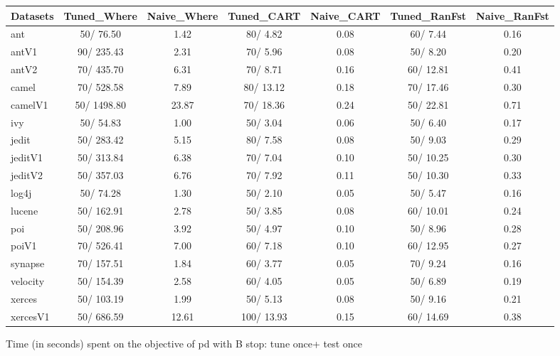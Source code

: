 \documentclass{acm_proc_article-sp}
\begin{document}


\clearpage
\begin{figure*}[!ht]
\scriptsize
\centering
  \begin{tabular}{l|c |c |c |c |c |c }
    \hline\hline
    Datasets & Tuned\_Where & Naive\_Where & Tuned\_CART & Naive\_CART & Tuned\_RanFst & Naive\_RanFst\\
    \hline
    ant & 50/ 76.50 & 1.42 & 80/ 4.82 & 0.08 & 60/ 7.44 & 0.16\\
    antV1 & 90/ 235.43 & 2.31 & 70/ 5.96 & 0.08 & 50/ 8.20 & 0.20\\
    antV2 & 70/ 435.70 & 6.31 & 70/ 8.71 & 0.16 & 60/ 12.81 & 0.41\\
    camel & 70/ 528.58 & 7.89 & 80/ 13.12 & 0.18 & 70/ 17.46 & 0.30\\
    camelV1 & 50/ 1498.80 & 23.87 & 70/ 18.36 & 0.24 & 50/ 22.81 & 0.71\\
    ivy & 50/ 54.83 & 1.00 & 50/ 3.04 & 0.06 & 50/ 6.40 & 0.17\\
    jedit & 50/ 283.42 & 5.15 & 80/ 7.58 & 0.08 & 50/ 9.03 & 0.29\\
    jeditV1 & 50/ 313.84 & 6.38 & 70/ 7.04 & 0.10 & 50/ 10.25 & 0.30\\
    jeditV2 & 50/ 357.03 & 6.76 & 70/ 7.92 & 0.11 & 50/ 10.30 & 0.33\\
    log4j & 50/ 74.28 & 1.30 & 50/ 2.10 & 0.05 & 50/ 5.47 & 0.16\\
    lucene & 50/ 162.91 & 2.78 & 50/ 3.85 & 0.08 & 60/ 10.01 & 0.24\\
    poi & 50/ 208.96 & 3.92 & 50/ 4.97 & 0.10 & 50/ 8.96 & 0.28\\
    poiV1 & 70/ 526.41 & 7.00 & 60/ 7.18 & 0.10 & 60/ 12.95 & 0.27\\
    synapse & 70/ 157.51 & 1.84 & 60/ 3.77 & 0.05 & 70/ 9.24 & 0.16\\
    velocity & 50/ 154.39 & 2.58 & 60/ 4.05 & 0.05 & 50/ 6.89 & 0.19\\
    xerces & 50/ 103.19 & 1.99 & 50/ 5.13 & 0.08 & 50/ 9.16 & 0.21\\
    xercesV1 & 50/ 686.59 & 12.61 & 100/ 13.93 & 0.15 & 60/ 14.69 & 0.38\\
  \end{tabular}
  \caption{Time (in seconds) spent on the objective of pd with B stop: tune once+ test once}
\end{figure*}
\end{document}
